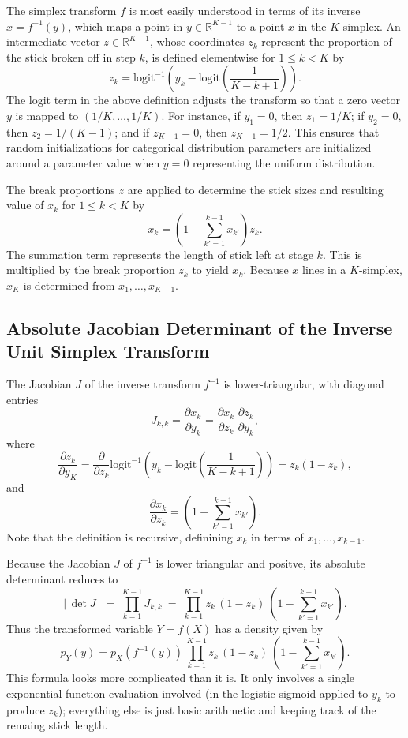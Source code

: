 \documentclass[10pt]{report}
\begin{document}
The simplex transform $f$ is most easily understood in terms of its
inverse $x = f^{-1}(y)$, which maps a point in $y \in
\mathbb{R}^{K-1}$ to a point $x$ in the $K$-simplex.  An intermediate
vector $z \in \mathbb{R}^{K-1}$, whose coordinates $z_k$ represent 
the proportion of the stick broken off in step $k$, is defined
elementwise for $1 \leq k < K$ by
%
\[
z_k = \mbox{logit}^{-1} \left( y_k 
                             - \mbox{logit} \left( \frac{1}{K - k + 1}
                                            \right)
                       \right).
\]
%
The logit term in the above definition adjusts the transform so that a
zero vector $y$ is mapped to $(1/K,\ldots,1/K)$.  For instance, if
$y_1 = 0$, then $z_1 = 1/K$; if $y_2 = 0$, then $z_2 = 1/(K-1)$; and
if $z_{K-1} = 0$, then $z_{K-1} = 1/2$.  This ensures that random
initializations for categorical distribution parameters are
initialized around a parameter value when $y = 0$ representing the
uniform distribution.

The break proportions $z$ are applied to determine the stick sizes and
resulting value of $x_k$ for $1 \leq k < K$ by
%
\[
x_k = 
\left( 1 - \sum_{k'=1}^{k-1} x_{k'} \right) z_k.
\]
%
The summation term represents the length of stick left at stage $k$.
This is multiplied by the break proportion $z_k$ to yield $x_k$.
Because $x$ lines in a $K$-simplex, $x_K$ is determined from
$x_1,\ldots,x_{K-1}$.

\subsection{Absolute Jacobian Determinant of the Inverse Unit Simplex
  Transform}

The Jacobian $J$ of the inverse transform $f^{-1}$ is
lower-triangular, with diagonal entries
\[
J_{k,k}
=
\frac{\partial x_k}{\partial y_k}
=
\frac{\partial x_k}{\partial z_k} \,
\frac{\partial z_k}{\partial y_k},
\]
%
where
\[
\frac{\partial z_k}{\partial y_K} 
= \frac{\partial}{\partial z_k} 
   \mbox{logit}^{-1} \left(
                       y_k - \mbox{logit} \left( \frac{1}{K-k+1}
                                          \right)
                    \right)
= z_k (1 - z_k),
\]
%
and
%
\[
\frac{\partial x_k}{\partial z_k}
=
\left( 
  1 - \sum_{k' = 1}^{k-1} x_{k'}
   \right)
.
\]
%
Note that the definition is recursive, definining $x_k$ in terms of
$x_{1},\ldots,x_{k-1}$.

Because the Jacobian $J$ of $f^{-1}$ is lower triangular and positve, its
absolute determinant reduces to
%
\[
\left| \, \det J \, \right|
\ = \
\prod_{k=1}^{K-1} J_{k,k}
\ = \
\prod_{k=1}^{K-1} 
z_k
\, 
(1 - z_k)
\
\left(
1 - \sum_{k'=1}^{k-1} x_{k'}
\right)
.
\]
%
Thus the transformed variable $Y = f(X)$ has a density given by
%
\[
p_Y(y) 
= p_X(f^{-1}(y))
\,
\prod_{k=1}^{K-1} 
z_k
\, 
(1 - z_k)
\
\left(
1 - \sum_{k'=1}^{k-1} x_{k'}
\right)
.
\]
%
This formula looks more complicated than it is.  It only involves a
single exponential function evaluation involved (in the logistic
sigmoid applied to $y_k$ to produce $z_k$);  everything else is just
basic arithmetic and keeping track of the remaing stick length.
\end{document}
